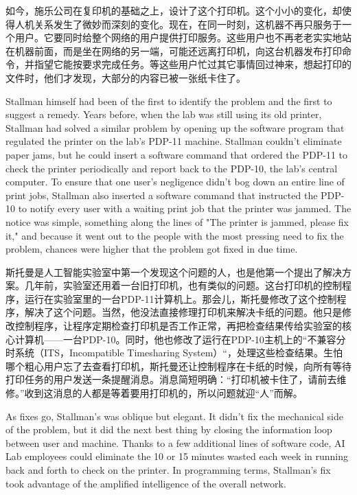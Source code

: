 \ifdefined\chs
如今，施乐公司在复印机的基础之上，设计了这个打印机。这个小小的变化，却使得人机关系发生了微妙而深刻的变化。现在，在同一时刻，这机器不再只服务于一个用户。它要同时给整个网络的用户提供打印服务。这些用户也不再老老实实地站在机器前面，而是坐在网络的另一端，可能还远离打印机，向这台机器发布打印命令，并指望它能按要求完成任务。等这些用户忙过其它事情回过神来，想起打印的文件时，他们才发现，大部分的内容已被一张纸卡住了。
\fi

\ifdefined\eng
Stallman himself had been of the first to identify the problem and the first to suggest a remedy. Years before, when the lab was still using its old printer, Stallman had solved a similar problem by opening up the software program that regulated the printer on the lab's PDP-11 machine. Stallman couldn't eliminate paper jams, but he could insert a software command that ordered the PDP-11 to check the printer periodically and report back to the PDP-10, the lab's central computer. To ensure that one user's negligence didn't bog down an entire line of print jobs, Stallman also inserted a software command that instructed the PDP-10 to notify every user with a waiting print job that the printer was jammed. The notice was simple, something along the lines of "The printer is jammed, please fix it," and because it went out to the people with the most pressing need to fix the problem, chances were higher that the problem got fixed in due time.
\fi

\ifdefined\chs
斯托曼是人工智能实验室中第一个发现这个问题的人，也是他第一个提出了解决方案。几年前，实验室还用着一台旧打印机，也有类似的问题。这台打印机的控制程序，运行在实验室里的一台PDP-11计算机上。那会儿，斯托曼修改了这个控制程序，解决了这个问题。当然，他没法直接修理打印机来解决卡纸的问题。他只是修改控制程序，让程序定期检查打印机是否工作正常，再把检查结果传给实验室的核心计算机——一台PDP-10。同时，他也修改了运行在PDP-10主机上的``不兼容分时系统（ITS，Incompatible Timesharing System）``，处理这些检查结果。生怕哪个粗心用户忘了去查看打印机，斯托曼还让控制程序在卡纸的时候，向所有等待打印任务的用户发送一条提醒消息。消息简短明确：``打印机被卡住了，请前去维修。''收到这消息的人都是等着要用打印机的，所以问题就迎``人''而解。
\fi

\ifdefined\eng
As fixes go, Stallman's was oblique but elegant. It didn't fix the mechanical side of the problem, but it did the next best thing by closing the information loop between user and machine. Thanks to a few additional lines of software code, AI Lab employees could eliminate the 10 or 15 minutes wasted each week in running back and forth to check on the printer. In programming terms, Stallman's fix took advantage of the amplified intelligence of the overall network.
\fi


